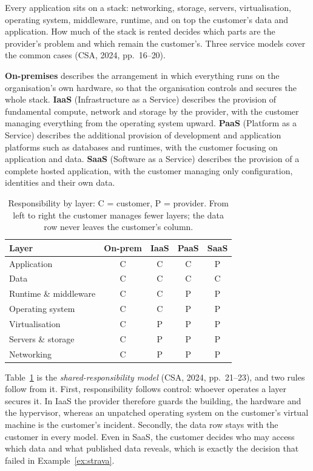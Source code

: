Every application sits on a stack: networking, storage, servers,
virtualisation, operating system, middleware, runtime, and on top the
customer's data and application. How much of the stack is rented decides
which parts are the provider's problem and which remain the customer's.
Three service models cover the common cases (CSA, 2024, pp.~16--20).

\begin{definition}\label{def:servicemodels}
\textbf{On-premises} describes the arrangement in which everything runs on the
organisation's own hardware, so that the organisation controls and secures the
whole stack. \textbf{IaaS} (Infrastructure as a Service) describes the
provision of fundamental compute, network and storage by the provider, with
the customer managing everything from the operating system upward.
\textbf{PaaS} (Platform as a Service) describes the additional provision of
development and application platforms such as databases and runtimes, with the
customer focusing on application and data. \textbf{SaaS} (Software as a
Service) describes the provision of a complete hosted application, with the
customer managing only configuration, identities and their own data.
\end{definition}

\begin{table}[h]
\centering
\small
\begin{tabular}{@{}lcccc@{}}
\toprule
\textbf{Layer} & \textbf{On-prem} & \textbf{IaaS} & \textbf{PaaS} & \textbf{SaaS} \\
\midrule
Application            & C & C & C & P \\
Data                   & C & C & C & C \\
Runtime \& middleware  & C & C & P & P \\
Operating system       & C & C & P & P \\
Virtualisation         & C & P & P & P \\
Servers \& storage     & C & P & P & P \\
Networking             & C & P & P & P \\
\bottomrule
\end{tabular}
\caption{Responsibility by layer: C = customer, P = provider. From left to
right the customer manages fewer layers; the data row never leaves the
customer's column.}
\label{tab:sharedresp}
\end{table}

Table~\ref{tab:sharedresp} is the \emph{shared-responsibility model} (CSA,
2024, pp.~21--23), and two rules follow from it. First, responsibility
follows control: whoever operates a layer secures it. In IaaS the provider
therefore guards the building, the hardware and the hypervisor, whereas an
unpatched operating system on the customer's virtual machine is the
customer's incident. Secondly, the data row stays with the customer in every
model. Even in SaaS, the customer decides who may access which data and what
published data reveals, which is exactly the decision that failed in
Example~\ref{ex:strava}.

